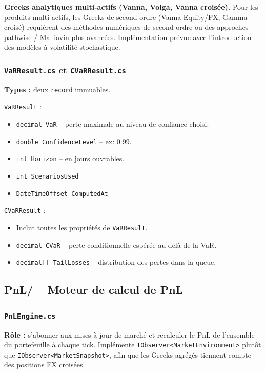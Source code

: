 \documentclass[a4paper,11pt]{article}
\newcommand{\cs}[1]{\texttt{\color{codeinline}#1}}
\begin{document}
\begin{tcolorbox}[todo]
\textbf{Greeks analytiques multi-actifs (Vanna, Volga, Vanna crois\'ee).}
Pour les produits multi-actifs, les Greeks de second ordre (Vanna Equity/FX, Gamma
crois\'e) requi\`erent des m\'ethodes num\'eriques de second ordre ou des approches
pathwise / Malliavin plus avanc\'ees. Impl\'ementation pr\'evue avec l'introduction
des mod\`eles \`a volatilit\'e stochastique.
\end{tcolorbox}

\subsubsection{\texttt{VaRResult.cs} et \texttt{CVaRResult.cs}}

\textbf{Types :} deux \cs{record} immuables.

\cs{VaRResult} :
\begin{itemize}[leftmargin=1.5em]
  \item \cs{decimal VaR} -- perte maximale au niveau de confiance choisi.
  \item \cs{double ConfidenceLevel} -- ex: 0.99.
  \item \cs{int Horizon} -- en jours ouvrables.
  \item \cs{int ScenariosUsed}
  \item \cs{DateTimeOffset ComputedAt}
\end{itemize}

\cs{CVaRResult} :
\begin{itemize}[leftmargin=1.5em]
  \item Inclut toutes les propri\'et\'es de \cs{VaRResult}.
  \item \cs{decimal CVaR} -- perte conditionnelle esp\'er\'ee au-del\`a de la VaR.
  \item \cs{decimal[] TailLosses} -- distribution des pertes dans la queue.
\end{itemize}

\subsection{PnL/ -- Moteur de calcul de PnL}

\subsubsection{\texttt{PnLEngine.cs}}

\textbf{R\^ole :} s'abonner aux mises \`a jour de march\'e et recalculer le PnL de
l'ensemble du portefeuille \`a chaque tick. Impl\'emente \cs{IObserver<MarketEnvironment>}
plut\^ot que \cs{IObserver<MarketSnapshot>}, afin que les Greeks agr\'eg\'es tiennent
compte des positions FX crois\'ees.
\end{document}
